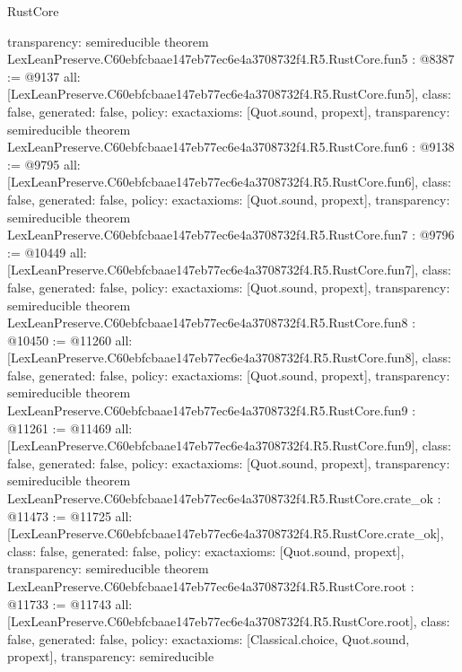 \begin{lexlean}{RustCore}
\begin{coremodule}
{  transparency: semireducible
}
theorem LexLeanPreserve.C60ebfcbaae147eb77ec6e4a3708732f4.R5.RustCore.fun5 : @8387 := @9137 {
  all: [LexLeanPreserve.C60ebfcbaae147eb77ec6e4a3708732f4.R5.RustCore.fun5],
  class: false,
  generated: false,
  policy: exact{axioms: [Quot.sound, propext]},
  transparency: semireducible
}
theorem LexLeanPreserve.C60ebfcbaae147eb77ec6e4a3708732f4.R5.RustCore.fun6 : @9138 := @9795 {
  all: [LexLeanPreserve.C60ebfcbaae147eb77ec6e4a3708732f4.R5.RustCore.fun6],
  class: false,
  generated: false,
  policy: exact{axioms: [Quot.sound, propext]},
  transparency: semireducible
}
theorem LexLeanPreserve.C60ebfcbaae147eb77ec6e4a3708732f4.R5.RustCore.fun7 : @9796 := @10449 {
  all: [LexLeanPreserve.C60ebfcbaae147eb77ec6e4a3708732f4.R5.RustCore.fun7],
  class: false,
  generated: false,
  policy: exact{axioms: [Quot.sound, propext]},
  transparency: semireducible
}
theorem LexLeanPreserve.C60ebfcbaae147eb77ec6e4a3708732f4.R5.RustCore.fun8 : @10450 := @11260 {
  all: [LexLeanPreserve.C60ebfcbaae147eb77ec6e4a3708732f4.R5.RustCore.fun8],
  class: false,
  generated: false,
  policy: exact{axioms: [Quot.sound, propext]},
  transparency: semireducible
}
theorem LexLeanPreserve.C60ebfcbaae147eb77ec6e4a3708732f4.R5.RustCore.fun9 : @11261 := @11469 {
  all: [LexLeanPreserve.C60ebfcbaae147eb77ec6e4a3708732f4.R5.RustCore.fun9],
  class: false,
  generated: false,
  policy: exact{axioms: [Quot.sound, propext]},
  transparency: semireducible
}
theorem LexLeanPreserve.C60ebfcbaae147eb77ec6e4a3708732f4.R5.RustCore.crate_ok : @11473 := @11725 {
  all: [LexLeanPreserve.C60ebfcbaae147eb77ec6e4a3708732f4.R5.RustCore.crate_ok],
  class: false,
  generated: false,
  policy: exact{axioms: [Quot.sound, propext]},
  transparency: semireducible
}
theorem LexLeanPreserve.C60ebfcbaae147eb77ec6e4a3708732f4.R5.RustCore.root : @11733 := @11743 {
  all: [LexLeanPreserve.C60ebfcbaae147eb77ec6e4a3708732f4.R5.RustCore.root],
  class: false,
  generated: false,
  policy: exact{axioms: [Classical.choice, Quot.sound, propext]},
  transparency: semireducible
}


\end{coremodule}
\end{lexlean}
